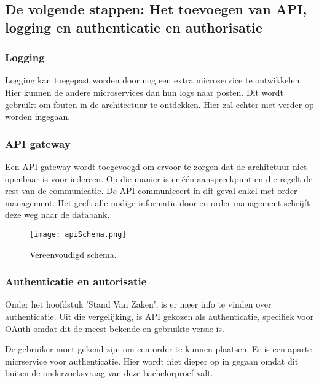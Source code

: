 \subsection{De volgende stappen: Het toevoegen van API, logging en authenticatie en authorisatie}
\subsubsection{Logging}
Logging kan toegepast worden door nog een extra microservice te ontwikkelen. Hier kunnen de andere microservices dan hun logs naar posten. Dit wordt gebruikt om fouten in de architectuur te ontdekken. Hier zal echter niet verder op worden ingegaan. 

\subsubsection{API gateway}
Een API gateway wordt toegevoegd om ervoor te zorgen dat de architctuur niet openbaar is voor iedereen. Op die manier is er één aanspreekpunt en die regelt de rest van de communicatie.
De API communiceert in dit geval enkel met order management. Het geeft alle nodige informatie door en order management schrijft deze weg naar de databank.
\begin{figure}[h!]
	\texttt{[image: apiSchema.png]}
	\caption{Vereenvoudigd schema.}
	\centering
\end{figure}

\subsubsection{Authenticatie en autorisatie}
Onder het hoofdstuk 'Stand Van Zaken', is er meer info te vinden over authenticatie. Uit die vergelijking, is API gekozen als authenticatie, specifiek voor OAuth omdat dit de meest bekende en gebruikte versie is.

De gebruiker moet gekend zijn om een order te kunnen plaatsen. Er is een aparte micrservice voor authenticatie. Hier wordt niet dieper op in gegaan omdat dit buiten de onderzoeksvraag van deze bachelorproef valt.



